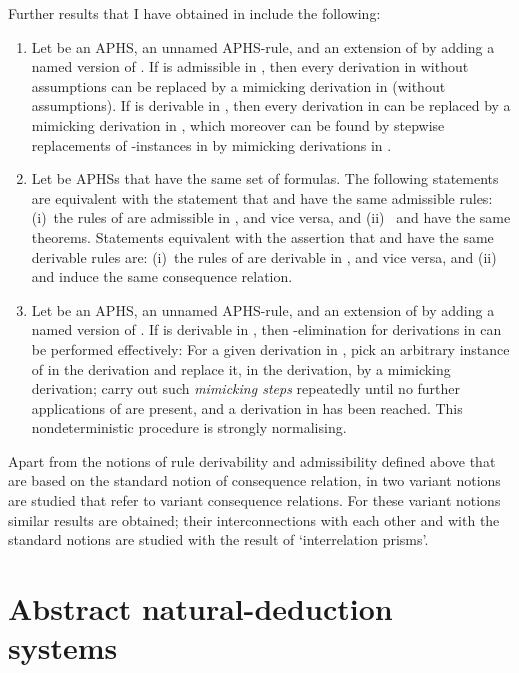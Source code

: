\documentclass[envcountsame,runningheads]{llncs}
\newcommand{\APHS}{A\hspace*{-0.3pt}P\hspace*{-0.6pt}H\hspace*{-0.4pt}S}
\begin{document}
Further results that I have obtained in \cite{grab:2003} include the
following:
\begin{enumerate}
\item Let  be an \APHS,  an unnamed \APHS-rule,
    and  an extension of 
    by adding a named version 
    of . 
    If  is admissible in ,
    then every derivation  in  
    without assumptions can
    be replaced by a mimicking derivation 
    in  (without assumptions).
    If  is derivable in ,
    then every derivation  in  can
    be replaced by a mimicking derivation  in , which
    moreover can be found by stepwise replacements 
    of -instances
    in  by mimicking derivations in . 
\item Let  be \APHS{s} that have the same set of formulas.
    The following statements are equivalent with 
    the statement that
     and  have the same admissible rules:
    (i)~the rules of  are admissible in ,
    and vice versa,
    and
    (ii)~ and  have the same theorems.
    Statements equivalent with the assertion that
     and  have the same derivable rules
    are:
    (i)~the rules of  are derivable in ,
    and vice versa,
    and
    (ii)~ and  induce the same consequence
    relation.
\item Let  be an \APHS,  an unnamed \APHS-rule,
    and  an extension of 
    by adding a named version 
    of . 
    If  is derivable in ,
    then -elimination for derivations in 
     can be performed effectively: 
    For a given derivation  in ,
    pick an arbitrary instance of  in the derivation
    and replace it, in the derivation,  by a mimicking derivation;
    carry out such {\em mimicking steps\/} repeatedly until no
    further applications of  are present,
    and a derivation  in  has been reached. 
    This nondeterministic procedure is strongly normalising.
\end{enumerate}


Apart from the notions of rule derivability and admissibility
defined above that
are based on the standard notion of consequence relation, 
in \cite{grab:2003} two variant notions are studied that refer to
variant consequence relations.
For these variant notions similar results are obtained;
their interconnections with each other and with the standard notions
are studied with the result of `interrelation prisms'.  



\section{Abstract natural-deduction systems}
  \label{sec:ANDSs}
\end{document}
